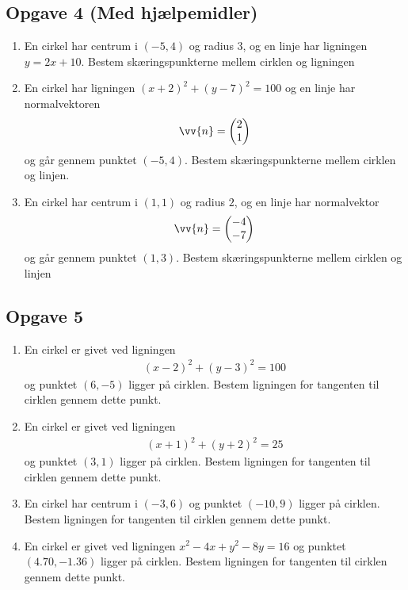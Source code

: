 \documentclass[12pt]{article}
\begin{document}
\subsection*{Opgave 4 (Med hjælpemidler)}
\begin{enumerate}[label=\roman*)]
	\item En cirkel har centrum i $(-5,4)$ og radius $3$, og en linje har ligningen $y = 2x+10$. Bestem skæringspunkterne mellem cirklen og ligningen
	\item En cirkel har ligningen $(x+2)^2+(y-7)^2 = 100$ og en linje har normalvektoren 
	\begin{align*}
		\vv{n} =
		\begin{pmatrix}
			2 \\ 1
		\end{pmatrix}
	\end{align*}
	og går gennem punktet $(-5,4)$. Bestem skæringspunkterne mellem cirklen og linjen. 
	\item En cirkel har centrum i $(1,1)$ og radius $2$, og en linje har normalvektor 
	\begin{align*}
		\vv{n} =
		\begin{pmatrix}
			-4 \\ -7			
		\end{pmatrix}
	\end{align*}
	og går gennem punktet $(1,3)$. Bestem skæringspunkterne mellem cirklen og linjen
\end{enumerate}

\subsection*{Opgave 5}
\begin{enumerate}[label=\roman*)]
	\item	En cirkel er givet ved ligningen 
	\begin{align*}
		(x-2)^2 + (y-3)^2 = 100
	\end{align*} og punktet $(6,-5)$ ligger på cirklen. Bestem ligningen for tangenten til cirklen gennem dette punkt.
	\item	En cirkel er givet ved ligningen
	\begin{align*}
		(x+1)^2 + (y+2)^2 = 25
	\end{align*}  og punktet	 $(3,1)$ ligger på cirklen. Bestem ligningen for tangenten til cirklen gennem dette punkt.	
	\item	En cirkel har centrum i $(-3,6)$ og punktet $(-10,9)$
	ligger på cirklen. Bestem ligningen for tangenten til cirklen gennem dette punkt.	
	\item	En cirkel er givet ved ligningen $x^2-4x+y^2-8y=16$ og punktet
	 $(4.70,-1.36)$
	ligger på cirklen. Bestem ligningen for tangenten til cirklen gennem dette punkt.	
\end{enumerate}
\end{document}
